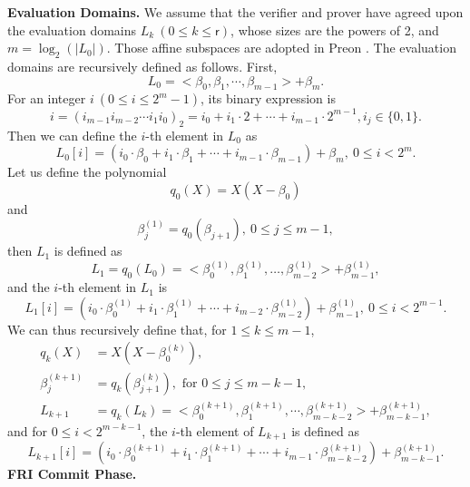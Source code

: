 \noindent\textbf{Evaluation Domains.} We assume that the verifier and prover have agreed upon the evaluation domains $L_k\ (0\le k \le \mathsf{r})$, whose sizes are the powers of 2,  and $m = \log_2(|L_0|)$. Those affine subspaces are adopted in Preon \cite{Preon2023}.  The evaluation domains are recursively defined as follows. First,
\begin{equation}
	L_0 = <\beta_{0},\beta_{1},\cdots, \beta_{m-1}> + \beta_{m}.
\end{equation}
For an integer $i\ (0\le i \le 2^{m} - 1)$, its binary expression is 
\[i = (i_{m-1}i_{m-2}\cdots i_1i_0)_2 = i_0 + i_1\cdot 2 + \cdots + i_{m-1}\cdot 2^{m-1}, i_j \in \{0,1\}.\]
Then we can define the $i$-th element in $L_0$ as
\begin{equation}
	L_0[i] = (i_0\cdot\beta_0 + i_1\cdot\beta_1+ \cdots + i_{m-1}\cdot\beta_{m-1}) + \beta_{m},\ 0\le i < 2^m.
\end{equation}
Let us define the polynomial
\begin{equation}
	q_0(X) = X(X - \beta_0)
\end{equation}
and \[\beta_j^{(1)} = q_{0}(\beta_{j+1}),\ 0\le j \le m-1,\]
then $L_1$ is defined as
\begin{equation}
	L_1 = q_0(L_0) = <\beta_0^{(1)}, \beta_1^{(1)}, \dots, \beta_{m-2}^{(1)} > + \beta_{m-1}^{(1)},
\end{equation}
and the $i$-th element in $L_1$ is 
\[L_1[i] =(i_0\cdot\beta_0^{(1)} + i_1\cdot\beta_1^{(1)}+ \cdots + i_{m-2 }\cdot\beta_{m-2}^{(1)}) + \beta_{m-1}^{(1)},\ 0\le i < 2^{m-1}. \]
We can thus recursively define that, { for } $1\le k \le m-1$, 
\begin{equation}
	\begin{aligned}
		q_k(X) &= X(X - \beta_0^{(k)}),\\
		\beta_j^{(k+1)} &= q_{k}(\beta_{j+1}^{(k)}), \text{ for } 0\le j \le m-k-1,\\
		L_{k+1} &= q_k(L_k) = <\beta_0^{(k+1)}, \beta_1^{(k+1)}, \cdots, \beta_{m-k-2}^{(k+1)} > + \beta_{m-k-1}^{(k+1)},
	\end{aligned}
\end{equation}
and for $ 0\le i < 2^{m-k-1}$, the $i$-th element of $L_{k+1}$ is defined as
\begin{equation*}
	L_{k+1}[i] =(i_0\cdot\beta_0^{(k+1)} + i_1\cdot\beta_1^{(k+1)}+ \cdots + i_{m-1}\cdot\beta_{m-k-2}^{(k+1)}) + \beta_{m-k-1}^{(k+1)}. 
\end{equation*}
\newline
\noindent\textbf{FRI Commit Phase.}

